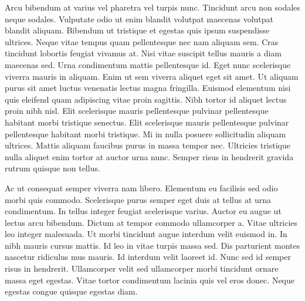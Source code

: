 \documentclass{article}
\begin{document}
Arcu bibendum at varius vel pharetra vel turpis nunc. Tincidunt arcu non sodales neque sodales. Vulputate odio ut enim blandit volutpat maecenas volutpat blandit aliquam. Bibendum ut tristique et egestas quis ipsum suspendisse ultrices. Neque vitae tempus quam pellentesque nec nam aliquam sem. Cras tincidunt lobortis feugiat vivamus at. Nisi vitae suscipit tellus mauris a diam maecenas sed. Urna condimentum mattis pellentesque id. Eget nunc scelerisque viverra mauris in aliquam. Enim ut sem viverra aliquet eget sit amet. Ut aliquam purus sit amet luctus venenatis lectus magna fringilla. Euismod elementum nisi quis eleifend quam adipiscing vitae proin sagittis. Nibh tortor id aliquet lectus proin nibh nisl. Elit scelerisque mauris pellentesque pulvinar pellentesque habitant morbi tristique senectus. Elit scelerisque mauris pellentesque pulvinar pellentesque habitant morbi tristique. Mi in nulla posuere sollicitudin aliquam ultrices. Mattis aliquam faucibus purus in massa tempor nec. Ultricies tristique nulla aliquet enim tortor at auctor urna nunc. Semper risus in hendrerit gravida rutrum quisque non tellus.

Ac ut consequat semper viverra nam libero. Elementum eu facilisis sed odio morbi quis commodo. Scelerisque purus semper eget duis at tellus at urna condimentum. In tellus integer feugiat scelerisque varius. Auctor eu augue ut lectus arcu bibendum. Dictum at tempor commodo ullamcorper a. Vitae ultricies leo integer malesuada. Ut morbi tincidunt augue interdum velit euismod in. In nibh mauris cursus mattis. Id leo in vitae turpis massa sed. Dis parturient montes nascetur ridiculus mus mauris. Id interdum velit laoreet id. Nunc sed id semper risus in hendrerit. Ullamcorper velit sed ullamcorper morbi tincidunt ornare massa eget egestas. Vitae tortor condimentum lacinia quis vel eros donec. Neque egestas congue quisque egestas diam.
\end{document}
